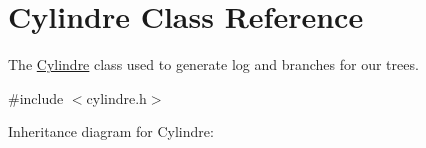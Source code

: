 \hypertarget{classCylindre}{}\section{Cylindre Class Reference}
\label{classCylindre}


The \hyperlink{classCylindre}{Cylindre} class used to generate log and branches for our trees.  




{\ttfamily \#include $<$cylindre.\+h$>$}



Inheritance diagram for Cylindre\+:
